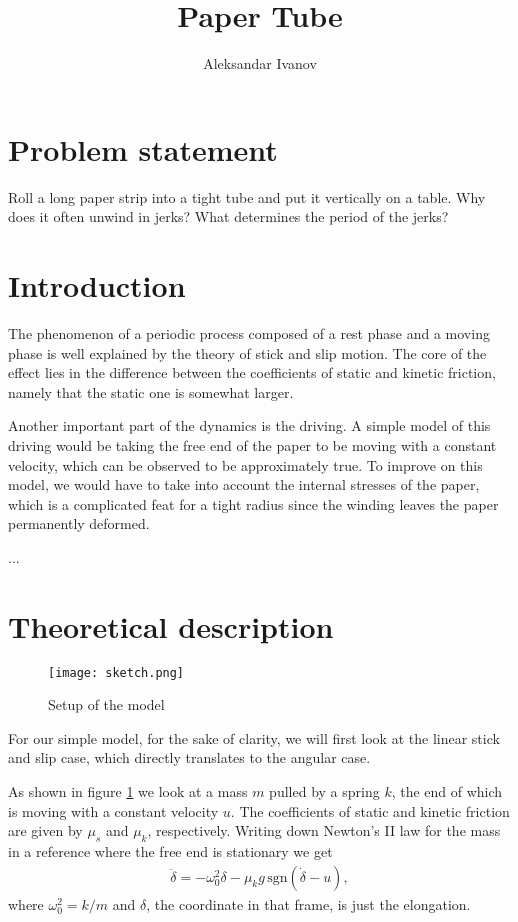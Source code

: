 \documentclass[10pt,a4paper,twocolumn]{article}
\begin{document}
\title{Paper Tube}
\author{Aleksandar Ivanov}
\date{}
\maketitle

\clearpage

\section{Problem statement}

Roll a long paper strip into a tight tube and put it vertically on a table. Why does it often unwind in jerks? What determines the period of the jerks?

\section{Introduction}

The phenomenon of a periodic process composed of a rest phase and a moving phase is well explained by the theory of stick and slip motion. The core of the effect lies in the difference between the coefficients of static and kinetic friction, namely that the static one is somewhat larger. 

Another important part of the dynamics is the driving. A simple model of this driving would be taking the free end of the paper to be moving with a constant velocity, which can be observed to be approximately true. To improve on this model, we would have to take into account the internal stresses of the paper, which is a complicated feat for a tight radius since the winding leaves the paper permanently deformed.


...

\section{Theoretical description}

\begin{figure}[H]
\centering
\captionsetup{justification=centering}
\texttt{[image: sketch.png]}
\caption{Setup of the model}
\label{fig:sketch}
\end{figure}

For our simple model, for the sake of clarity, we will first look at the linear stick and slip case, which directly translates to the angular case.

As shown in figure \ref{fig:sketch} we look at a mass $m$ pulled by a spring $k$, the end of which is moving with a constant velocity $u$. The coefficients of static and kinetic friction are given by $\mu_s$ and $\mu_k$, respectively. Writing down Newton's II law for the mass in a reference where the free end is stationary we get
%
\begin{align}
\ddot{\delta}= -\omega_0^2 \delta - \mu_k g \,\mathrm{sgn}(\dot{\delta} - u),
\end{align}
%
where $\omega_0^2 = k/m$ and $\delta$, the coordinate in that frame, is just the elongation.
\end{document}
